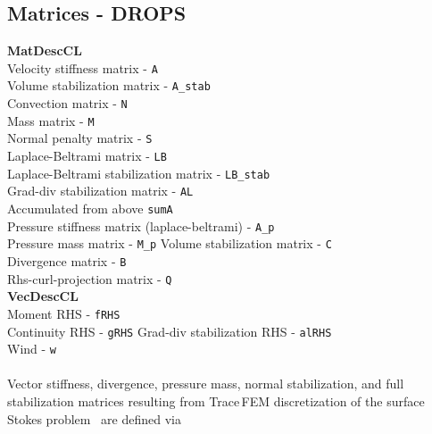 \documentclass{article}
\begin{document}
\subsection{Matrices - DROPS}

\textbf{MatDescCL}\\
Velocity stiffness matrix - \verb|A|  \\
Volume stabilization matrix - \verb|A_stab|\\
Convection matrix -  \verb|N|\\
Mass matrix - \verb|M|\\
Normal penalty matrix - \verb|S|\\ 
Laplace-Beltrami matrix - \verb|LB| \\
Laplace-Beltrami stabilization matrix - \verb|LB_stab|\\ 
Grad-div stabilization matrix - \verb|AL| \\ 
Accumulated from above \verb|sumA|\\ 
Pressure stiffness matrix (laplace-beltrami) - \verb|A_p|\\
Pressure mass matrix - \verb|M_p| 
Volume stabilization matrix - \verb|C|\\
Divergence matrix - \verb|B|\\
Rhs-curl-projection matrix - \verb|Q|\\
\textbf{VecDescCL}\\
Moment RHS - \verb|fRHS|\\
Continuity RHS - \verb|gRHS|
Grad-div stabilization RHS - \verb|alRHS|\\
Wind - \verb|w|\\ 
\\
Vector stiffness, divergence, pressure mass, normal stabilization, and full stabilization matrices resulting from Trace\,FEM discretization of the surface Stokes problem~\cite{surfstokes} are defined via
\end{document}
